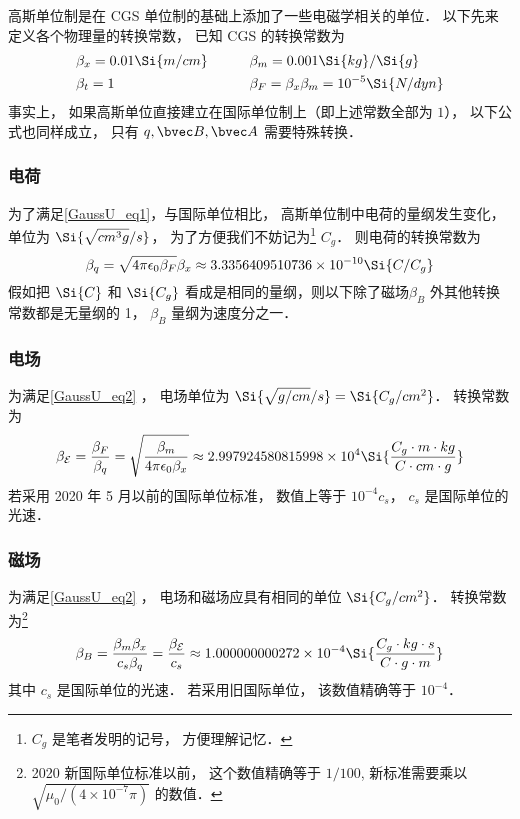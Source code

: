 

高斯单位制是在 CGS 单位制的基础上添加了一些电磁学相关的单位． 以下先来定义各个物理量的转换常数， 
已知 CGS 的转换常数为
\begin{equation}
\begin{aligned}
&\beta_x = 0.01\Si{m/cm} &\qquad &\beta_m = 0.001\Si{kg}/\Si{g}\\
&\beta_t = 1 &\qquad  &\beta_F = \beta_x \beta_m = 10^{-5}\Si{N/dyn}
\end{aligned}
\end{equation}
事实上， 如果高斯单位直接建立在国际单位制上（即上述常数全部为 $1$）， 以下公式也同样成立， 只有 $q, \bvec B, \bvec A$ 需要特殊转换．

\subsubsection{电荷}
为了满足\autoref{GaussU_eq1}，与国际单位相比， 高斯单位制中电荷的量纲发生变化， 单位为 $\Si{\sqrt{cm^3 g}/s}$， 为了方便我们不妨记为\footnote{$C_g$ 是笔者发明的记号， 方便理解记忆．} $C_g$． 则电荷的转换常数为
\begin{equation}
\beta_q = \sqrt{4\pi\epsilon_0\beta_F} \beta_x \approx 3.3356409510736\times 10^{-10} \Si{C/C_g}
\end{equation}
假如把 $\Si{C}$ 和 $\Si{C_g}$ 看成是相同的量纲，则以下除了磁场$\beta_B$ 外其他转换常数都是无量纲的 1， $\beta_B$ 量纲为速度分之一．

\subsubsection{电场}
为满足\autoref{GaussU_eq2} ， 电场单位为 $\Si{\sqrt{g/cm}/s} = \Si{C_g/cm^2}$． 转换常数为
\begin{equation}
\beta_{\mathcal E} = \frac{\beta_F}{\beta_q} = \sqrt{\frac{\beta_m}{4\pi\epsilon_0 \beta_x}} \approx 2.997924580815998\times 10^4 \Si{\frac{C_g\cdot m\cdot kg}{C\cdot cm\cdot g}}
\end{equation}
若采用 2020 年 5 月以前的国际单位标准， 数值上等于 $10^{-4} c_{s}$， $c_{s}$ 是国际单位的光速．

\subsubsection{磁场}
为满足\autoref{GaussU_eq2} ， 电场和磁场应具有相同的单位 $\Si{C_g/cm^2}$． 转换常数为\footnote{2020 新国际单位标准以前， 这个数值精确等于 $1/100$, 新标准需要乘以 $\sqrt{\mu_0/(4\times 10^{-7}\pi)}$ 的数值．}
\begin{equation}
\beta_B = \frac{\beta_m\beta_x}{c_s\beta_q} = \frac{\beta_{\mathcal E}}{c_s} \approx 1.000000000272\times 10^{-4} \Si{\frac{C_g\cdot kg \cdot s}{C \cdot g \cdot m}}
\end{equation}
其中 $c_{s}$ 是国际单位的光速． 若采用旧国际单位， 该数值精确等于 $10^{-4}$．


